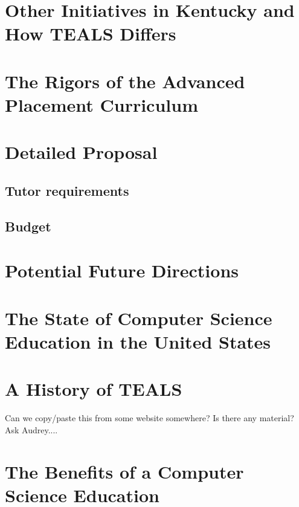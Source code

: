 \documentclass[11pt]{article}
\begin{document}



%
%
%
%
%
%
%
%



\section{Other Initiatives in Kentucky and How TEALS Differs}\label{sec:diffs}

\section{The Rigors of the Advanced Placement Curriculum}\label{sec:ap}

\section{Detailed Proposal}\label{sec:proposal}

\subsection{Tutor requirements}\label{ssec:tutor}

\subsection{Budget}\label{ssec:budget}

\section{Potential Future Directions}\label{sec:future}

\appendix

\section{The State of Computer Science Education in the United States}\label{sec:CSInUSA}

\section{A History of TEALS}\label{sec:TEALS}

Can we copy/paste this from some website somewhere? Is there any material? Ask Audrey....

\section{The Benefits of a Computer Science Education}\label{sec:benefits}



\end{document}
